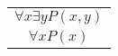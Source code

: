 \documentclass{jarticle}
\begin{document}
\begin{bundle}{
		\begin{tabular}{c}
				$\forall x \exists y P(x,y)$ \\
				$\forall x P(x)$
		\end{tabular}
		}
\end{bundle}
\end{document}
